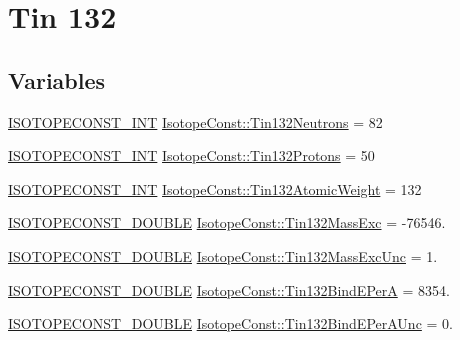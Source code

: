 \hypertarget{group___isotope_const-_tin-_sn132}{}\section{Tin 132}
\label{group___isotope_const-_tin-_sn132}
\subsection*{Variables}
\begin{DoxyCompactItemize}
\item 
\mbox{\hyperlink{group___isotope_const-_macros_ga5f18360b3e99483a35c32d789e62621c}{I\+S\+O\+T\+O\+P\+E\+C\+O\+N\+S\+T\+\_\+\+I\+NT}} \mbox{\hyperlink{group___isotope_const-_tin-_sn132_gab05fe213b0107a568f2e9760ae4815f3}{Isotope\+Const\+::\+Tin132\+Neutrons}} = 82
\item 
\mbox{\hyperlink{group___isotope_const-_macros_ga5f18360b3e99483a35c32d789e62621c}{I\+S\+O\+T\+O\+P\+E\+C\+O\+N\+S\+T\+\_\+\+I\+NT}} \mbox{\hyperlink{group___isotope_const-_tin-_sn132_gab05ecc191597039a3567bc42db534ae1}{Isotope\+Const\+::\+Tin132\+Protons}} = 50
\item 
\mbox{\hyperlink{group___isotope_const-_macros_ga5f18360b3e99483a35c32d789e62621c}{I\+S\+O\+T\+O\+P\+E\+C\+O\+N\+S\+T\+\_\+\+I\+NT}} \mbox{\hyperlink{group___isotope_const-_tin-_sn132_ga8c4b295e4d3dcbf84abd3884231da1fd}{Isotope\+Const\+::\+Tin132\+Atomic\+Weight}} = 132
\item 
\mbox{\hyperlink{group___isotope_const-_macros_ga8f45a7272ce02c0b4c65c44636ed719a}{I\+S\+O\+T\+O\+P\+E\+C\+O\+N\+S\+T\+\_\+\+D\+O\+U\+B\+LE}} \mbox{\hyperlink{group___isotope_const-_tin-_sn132_gaa1c1d6d47c65ea5561176ebf9ddb5345}{Isotope\+Const\+::\+Tin132\+Mass\+Exc}} = -\/76546.
\item 
\mbox{\hyperlink{group___isotope_const-_macros_ga8f45a7272ce02c0b4c65c44636ed719a}{I\+S\+O\+T\+O\+P\+E\+C\+O\+N\+S\+T\+\_\+\+D\+O\+U\+B\+LE}} \mbox{\hyperlink{group___isotope_const-_tin-_sn132_ga3e91728acc46fed4225e7e1bfa809f6c}{Isotope\+Const\+::\+Tin132\+Mass\+Exc\+Unc}} = 1.
\item 
\mbox{\hyperlink{group___isotope_const-_macros_ga8f45a7272ce02c0b4c65c44636ed719a}{I\+S\+O\+T\+O\+P\+E\+C\+O\+N\+S\+T\+\_\+\+D\+O\+U\+B\+LE}} \mbox{\hyperlink{group___isotope_const-_tin-_sn132_ga65eecdb118d74f35161fda409bd47eaf}{Isotope\+Const\+::\+Tin132\+Bind\+E\+PerA}} = 8354.
\item 
\mbox{\hyperlink{group___isotope_const-_macros_ga8f45a7272ce02c0b4c65c44636ed719a}{I\+S\+O\+T\+O\+P\+E\+C\+O\+N\+S\+T\+\_\+\+D\+O\+U\+B\+LE}} \mbox{\hyperlink{group___isotope_const-_tin-_sn132_ga09c8a2bd94fbb36b6c10ae49a6870a34}{Isotope\+Const\+::\+Tin132\+Bind\+E\+Per\+A\+Unc}} = 0.

\end{DoxyCompactItemize}
